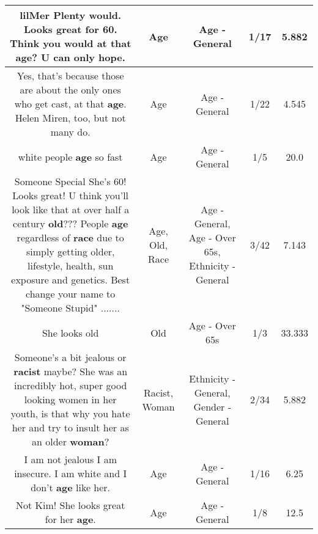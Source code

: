 \documentclass[11pt]{article}
\newlength\mylength
\begin{document}
\begin{center}
\begin{longtable}{|C{.65\mylength}|C{.30\mylength}|C{.12\mylength}|C{.12\mylength}|C{.12\mylength}|}
  \small lilMer Plenty would. Looks great for 60. Think you would at that \textbf{age}? U can only hope.\normalsize   & Age & Age - General & 1/17 & 5.882 \\  \hline
  \small Yes, that's because those are about the only ones who get cast, at that \textbf{age}. Helen Miren, too, but not many do.\normalsize   & Age & Age - General & 1/22 & 4.545 \\  \hline
  \small white people \textbf{age} so fast\normalsize   & Age & Age - General & 1/5 & 20.0 \\  \hline
  \small Someone Special She's 60! Looks great! U think you'll look like that at over half a century \textbf{old}??? People \textbf{age} regardless of \textbf{race} due to simply getting older, lifestyle, health, sun exposure and genetics. Best change your name to "Someone Stupid" .......\normalsize   & Age, Old, Race & Age - General, Age - Over 65s, Ethnicity - General & 3/42 & 7.143 \\  \hline
  \small She looks old\normalsize   & Old & Age - Over 65s & 1/3 & 33.333 \\  \hline
  \small Someone's a bit jealous or \textbf{racist} maybe? She was an incredibly hot, super good looking women in her youth, is that why you hate her and try to insult her as an older \textbf{woman}?\normalsize   & Racist, Woman & Ethnicity - General, Gender - General & 2/34 & 5.882 \\  \hline
  \small I am not jealous I am insecure. I am white and I don't \textbf{age} like her.\normalsize   & Age & Age - General & 1/16 & 6.25 \\  \hline
  \small Not Kim! She looks great for her \textbf{age}.\normalsize   & Age & Age - General & 1/8 & 12.5 \\  \hline

\end{longtable}
\end{center}
\end{document}

